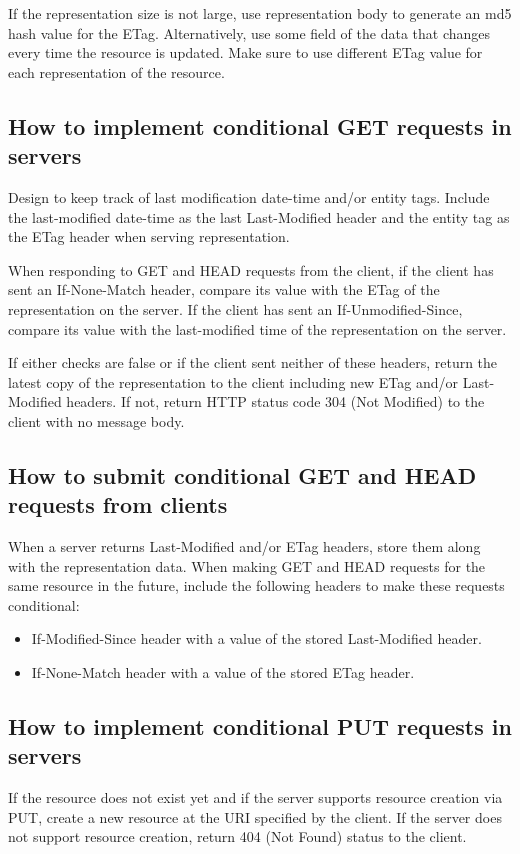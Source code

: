 \documentclass[11pt,a4paper]{article}
\begin{document}
If the representation size is not large, use representation body to generate an md5 hash value for the ETag. Alternatively, use some field of the data that changes every time the resource is updated. Make sure to use different ETag value for each representation of the resource.

\subsection{How to implement conditional GET requests in servers}
Design to keep track of last modification date-time and/or entity tags. Include the last-modified date-time as the last Last-Modified header and the entity tag as the ETag header when serving representation.

When responding to GET and HEAD requests from the client, if the client has sent an If-None-Match header, compare its value with the ETag of the representation on the server. If the client has sent an If-Unmodified-Since, compare its value with the last-modified time of the representation on the server.

If either checks are false or if the client sent neither of these headers, return the latest copy of the representation to the client including new ETag and/or Last-Modified headers. If not, return HTTP status code 304 (Not Modified) to the client with no message body.

\subsection{How to submit conditional GET and HEAD requests from clients}
When a server returns Last-Modified and/or ETag headers, store them along with the representation data. When making GET and HEAD requests for the same resource in the future, include the following headers to make these requests conditional:
\begin{itemize}
	\item If-Modified-Since header with a value of the stored Last-Modified header.
	\item If-None-Match header with a value of the stored ETag header.
\end{itemize}

\subsection{How to implement conditional PUT requests in servers}
If the resource does not exist yet and if the server supports resource creation via PUT, create a new resource at the URI specified by the client. If the server does not support resource creation, return 404 (Not Found) status to the client.
\end{document}
